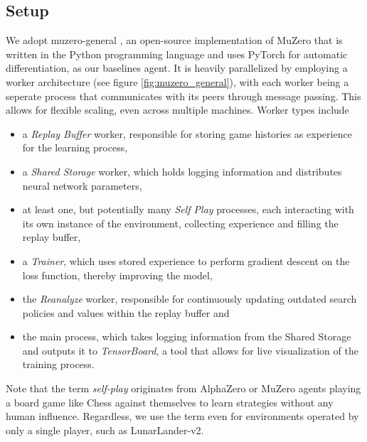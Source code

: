 \subsection{Setup}
We adopt muzero-general \cite{muzero-general}, an open-source implementation of MuZero that is written in the Python programming language and uses PyTorch for automatic differentiation, as our baselines agent. It is heavily parallelized by employing a worker architecture (see figure \ref{fig:muzero_general}), with each worker being a seperate process that communicates with its peers through message passing. This allows for flexible scaling, even across multiple machines. Worker types include
\begin{itemize}
    \item a \textit{Replay Buffer} worker, responsible for storing game histories as experience for the learning process,
    \item a \textit{Shared Storage} worker, which holds logging information and distributes neural network parameters,
    \item at least one, but potentially many \textit{Self Play} processes, each interacting with its own instance of the environment, collecting experience and filling the replay buffer,
    \item a \textit{Trainer}, which uses stored experience to perform gradient descent on the loss function, thereby improving the model,
    \item the \textit{Reanalyze} worker, responsible for continuously updating outdated search policies and values within the replay buffer and
    \item the main process, which takes logging information from the Shared Storage and outputs it to \textit{TensorBoard}, a tool that allows for live visualization of the training process.
\end{itemize}
Note that the term \textit{self-play} originates from AlphaZero or MuZero agents playing a board game like Chess against themselves to learn strategies without any human influence. Regardless, we use the term even for environments operated by only a single player, such as LunarLander-v2.
